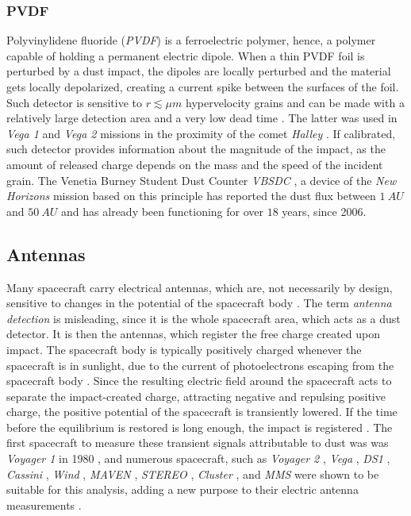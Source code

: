 \subsubsection{PVDF} 

Polyvinylidene fluoride (\textit{PVDF}) is a ferroelectric polymer, hence, a polymer capable of holding a permanent electric dipole. When a thin PVDF foil is perturbed by a dust impact, the dipoles are locally perturbed and the material gets locally depolarized, creating a current spike between the surfaces of the foil. Such detector is sensitive to $r \lesssim \si{\mu m}$ hypervelocity grains and can be made with a relatively large detection area and a very low dead time \citep{tuzzolino1996applications}. The latter was used in \textit{Vega 1} and \textit{Vega 2} missions in the proximity of the comet \textit{Halley} \citep{simpson1988dust}. If calibrated, such detector provides information about the magnitude of the impact, as the amount of released charge depends on the mass and the speed of the incident grain. The Venetia Burney Student Dust Counter \textit{VBSDC} \citep{james2010pvdf}, a device of the \textit{New Horizons} mission based on this principle has reported the dust flux between $\SI{1}{AU}$ and $\SI{50}{AU}$ \citep{bernardoni2022student} and has already been functioning for over $18$ years, since 2006. 

\subsection{Antennas}

Many spacecraft carry electrical antennas, which are, not necessarily by design, sensitive to changes in the potential of the spacecraft body \citep{meyer2017frequency}. The term \textit{antenna detection} is misleading, since it is the whole spacecraft area, which acts as a dust detector. It is then the antennas, which register the free charge created upon impact. The spacecraft body is typically positively charged whenever the spacecraft is in sunlight, due to the current of photoelectrons escaping from the spacecraft body \citep{guillemant2013simulation}. Since the resulting electric field around the spacecraft acts to separate the impact-created charge, attracting negative and repulsing positive charge, the positive potential of the spacecraft is transiently lowered. If the time before the equilibrium is restored is long enough, the impact is registered \citep{mann2019dust}. The first spacecraft to measure these transient signals attributable to dust was was \textit{Voyager 1} in 1980 \citep{scarf1982voyager,gurnett1997micron}, and numerous spacecraft, such as \textit{Voyager 2} \citep{gurnett1983micron}, \textit{Vega} \citep{laakso1989impacts}, \textit{DS1} \citep{tsurutani2003dust}, \textit{Cassini} \citep{kurth2006cassini}, \textit{Wind} \citep{malaspina2014interplanetary}, \textit{MAVEN} \citep{andersson2015dust}, \textit{STEREO} \citep{zaslavsky2012interplanetary}, \textit{Cluster} \citep{vaverka2017detection}, and \textit{MMS} \citep{vaverka2018comparison} were shown to be suitable for this analysis, adding a new purpose to their electric antenna measurements \cite{meyer2001detecting}. 


